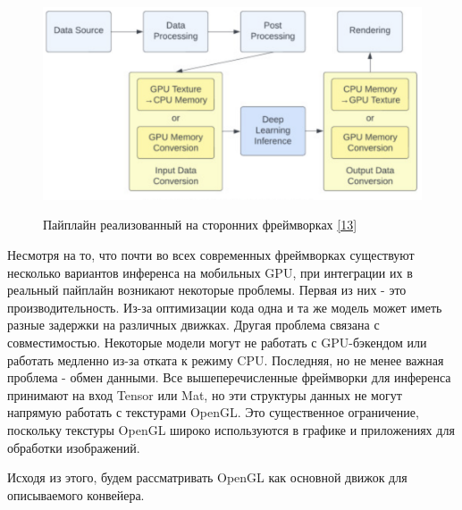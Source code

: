\documentclass[a4paper,14pt]{extreport}
\begin{document}
        \begin{figure}[!h]
            \begin{center}
                \begin{minipage}[!h]{0.75\linewidth}
                    \includegraphics[width=1\linewidth]{images-pipeline/data.png}
                    \label{ris:netron}
                    \caption{Пайплайн реализованный на сторонних фреймворках \hyperlink{[13]}{[13]}}
                \end{minipage}
            \end{center}
        \end{figure}
        
        Несмотря на то, что почти во всех современных фреймворках существуют  несколько вариантов инференса на мобильных GPU, при интеграции их в реальный пайплайн возникают некоторые проблемы. Первая из них - это производительность. Из-за оптимизации кода одна и та же модель может иметь разные задержки на различных движках. Другая проблема связана с совместимостью. Некоторые модели могут не работать с GPU-бэкендом или работать медленно из-за отката к режиму CPU. Последняя, но не менее важная проблема - обмен данными. Все вышеперечисленные фреймворки для инференса принимают на вход Tensor или Mat, но эти структуры данных не могут напрямую работать с текстурами OpenGL. Это существенное ограничение, поскольку текстуры OpenGL широко используются в графике и приложениях для обработки изображений.
        
        Исходя из этого, будем рассматривать OpenGL как основной движок для описываемого конвейера.
\end{document}
